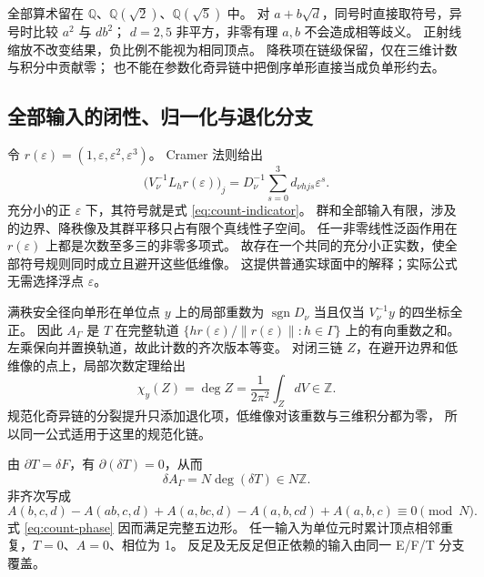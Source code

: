 全部算术留在 $\mathbb Q$、$\mathbb Q(\sqrt2)$、$\mathbb Q(\sqrt5)$ 中。
对 $a+b\sqrt d$，同号时直接取符号，异号时比较 $a^2$ 与 $db^2$；
$d=2,5$ 非平方，非零有理 $a,b$ 不会造成相等歧义。
正射线缩放不改变结果，负比例不能视为相同顶点。
降秩项在链级保留，仅在三维计数与积分中贡献零；
也不能在参数化奇异链中把倒序单形直接当成负单形约去。

\subsection{全部输入的闭性、归一化与退化分支}
令 $r(\varepsilon)=(1,\varepsilon,\varepsilon^2,\varepsilon^3)$。
Cramer 法则给出
\[
\bigl(V_\nu^{-1}L_h r(\varepsilon)\bigr)_j
=D_\nu^{-1}\sum_{s=0}^3d_{\nu hjs}\varepsilon^s.
\]
充分小的正 $\varepsilon$ 下，其符号就是式 \eqref{eq:count-indicator}。
群和全部输入有限，涉及的边界、降秩像及其群平移只占有限个真线性子空间。
任一非零线性泛函作用在 $r(\varepsilon)$ 上都是次数至多三的非零多项式。
故存在一个共同的充分小正实数，使全部符号规则同时成立且避开这些低维像。
这提供普通实球面中的解释；实际公式无需选择浮点 $\varepsilon$。

满秩安全径向单形在单位点 $y$ 上的局部重数为
$\operatorname{sgn}D_\nu$ 当且仅当 $V_\nu^{-1}y$ 的四坐标全正。
因此 $A_\Gamma$ 是 $T$ 在完整轨道
$\{hr(\varepsilon)/\|r(\varepsilon)\|:h\in\Gamma\}$ 上的有向重数之和。
左乘保向并置换轨道，故此计数的齐次版本等变。
对闭三链 $Z$，在避开边界和低维像的点上，局部次数定理给出
\begin{equation}
\chi_y(Z)=\deg Z=\frac1{2\pi^2}\int_ZdV\in\mathbb Z.
\label{eq:count-degree}
\end{equation}
规范化奇异链的分裂提升只添加退化项，低维像对该重数与三维积分都为零，
所以同一公式适用于这里的规范化链。

由 $\partial T=\delta F$，有 $\partial(\delta T)=0$，从而
\begin{equation}
\boxed{\delta A_\Gamma=N\deg(\delta T)\in N\mathbb Z.}
\label{eq:count-cocycle}
\end{equation}
非齐次写成
\[
A(b,c,d)-A(ab,c,d)+A(a,bc,d)-A(a,b,cd)+A(a,b,c)\equiv0\pmod N.
\]
式 \eqref{eq:count-phase} 因而满足完整五边形。
任一输入为单位元时累计顶点相邻重复，$T=0$、$A=0$、相位为 1。
反足及无反足但正依赖的输入由同一 E/F/T 分支覆盖。

